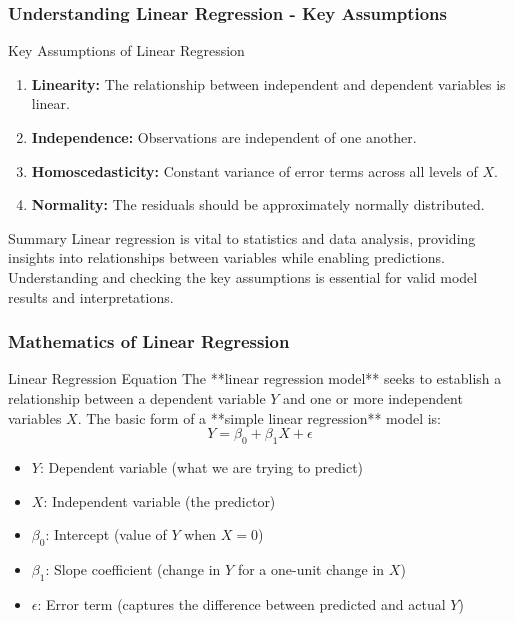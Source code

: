 \documentclass[aspectratio=169]{beamer}
\begin{document}
\begin{frame}[fragile]
    \frametitle{Understanding Linear Regression - Key Assumptions}
    \begin{block}{Key Assumptions of Linear Regression}
        \begin{enumerate}
            \item \textbf{Linearity:} The relationship between independent and dependent variables is linear.
            \item \textbf{Independence:} Observations are independent of one another.
            \item \textbf{Homoscedasticity:} Constant variance of error terms across all levels of \(X\).
            \item \textbf{Normality:} The residuals should be approximately normally distributed.
        \end{enumerate}
    \end{block}
    
    \begin{block}{Summary}
        Linear regression is vital to statistics and data analysis, providing insights into relationships between variables while enabling predictions. 
        Understanding and checking the key assumptions is essential for valid model results and interpretations.
    \end{block}
\end{frame}

\begin{frame}[fragile]
    \frametitle{Mathematics of Linear Regression}
    \begin{block}{Linear Regression Equation}
        The **linear regression model** seeks to establish a relationship between a dependent variable \(Y\) and one or more independent variables \(X\). The basic form of a **simple linear regression** model is:
        \begin{equation}
        Y = \beta_0 + \beta_1 X + \epsilon
        \end{equation}
        \begin{itemize}
            \item \(Y\): Dependent variable (what we are trying to predict)
            \item \(X\): Independent variable (the predictor)
            \item \(\beta_0\): Intercept (value of \(Y\) when \(X = 0\))
            \item \(\beta_1\): Slope coefficient (change in \(Y\) for a one-unit change in \(X\))
            \item \(\epsilon\): Error term (captures the difference between predicted and actual \(Y\))
        \end{itemize}
    \end{block}
\end{frame}
\end{document}
